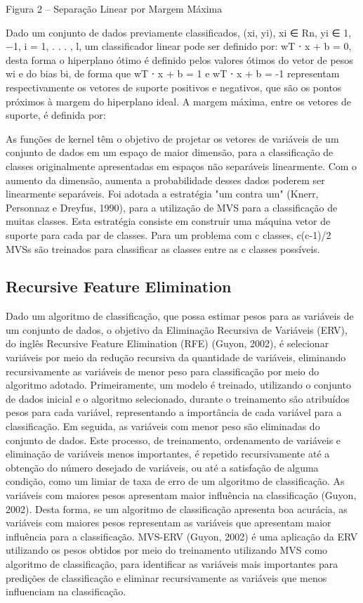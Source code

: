 Figura 2 – Separação Linear por Margem Máxima

Dado um conjunto de dados previamente classificados, (xi, yi), xi ∈ Rn, yi ∈ {1, −1}, i = 1, . . . , l, um classificador linear pode ser definido por: wT ⋅ x + b = 0, desta forma o hiperplano ótimo é definido pelos valores ótimos do vetor de pesos wi e do bias bi, de forma que wT ⋅ x + b = 1 e wT ⋅ x + b = -1 representam respectivamente os vetores de suporte positivos e negativos, que são os pontos próximos à margem do hiperplano ideal. A margem máxima, entre os vetores de suporte, é definida por:

As funções de kernel têm o objetivo de projetar os vetores de variáveis de um conjunto de dados em um espaço de maior dimensão, para a classificação de classes originalmente apresentadas em espaços não separáveis linearmente. Com o aumento da dimensão, aumenta a probabilidade desses dados poderem ser linearmente separáveis. 
Foi adotada a estratégia "um contra um" (Knerr, Personnaz e Dreyfus, 1990), para a utilização de MVS para a classificação de muitas classes. Esta estratégia consiste em construir uma máquina vetor de suporte para cada par de classes. Para um problema com c classes, c(c-1)/2 MVSs são treinados para classificar as classes entre as c classes possíveis.

\subsection{Recursive Feature Elimination}

Dado um algoritmo de classificação, que possa estimar pesos para as variáveis de um conjunto de dados, o objetivo da Eliminação Recursiva de Variáveis (ERV), do inglês Recursive Feature Elimination (RFE) (Guyon, 2002), é selecionar variáveis por meio da redução recursiva da quantidade de variáveis, eliminando recursivamente as variáveis de menor peso para classificação por meio do algoritmo adotado. 
Primeiramente, um modelo é treinado, utilizando o conjunto de dados inicial e o algoritmo selecionado, durante o treinamento são atribuídos pesos para cada variável, representando a importância de cada variável para a classificação. Em seguida, as variáveis com menor peso são eliminadas do conjunto de dados. Este processo, de treinamento, ordenamento de variáveis e eliminação de variáveis menos importantes, é repetido recursivamente até a obtenção do número desejado de variáveis, ou até a satisfação de alguma condição, como um limiar de taxa de erro de um algoritmo de classificação.
As variáveis com maiores pesos apresentam maior influência na classificação (Guyon, 2002). Desta forma, se um algoritmo de classificação apresenta boa acurácia, as variáveis com maiores pesos representam as variáveis que apresentam maior influência para a classificação.
MVS-ERV (Guyon, 2002) é uma aplicação da ERV utilizando os pesos obtidos por meio do treinamento utilizando MVS como algoritmo de classificação, para identificar as variáveis mais importantes para predições de classificação e eliminar recursivamente as variáveis que menos influenciam na classificação.


